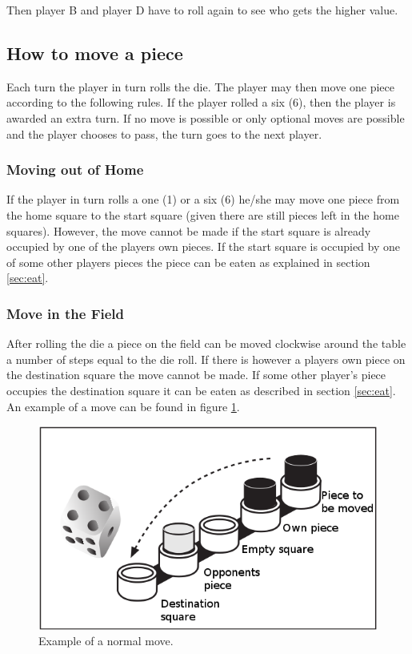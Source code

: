 \documentclass[10pt,a4paper]{article}
\begin{document}
Then player B and player D have to roll again to see who gets the higher value.

\subsection{How to move a piece}

Each turn the player in turn rolls the die. The player may then move one piece according to the following rules. If the player rolled a six (6), then the player is awarded an extra turn. If no move is possible or only optional moves are possible and the player chooses to pass, the turn goes to the next player.

\subsubsection{Moving out of Home}

If the player in turn rolls a one (1) or a six (6) he/she may move one piece from the home square to the start square (given there are still pieces left in the home squares). However, the move cannot be made if the start square is already occupied by one of the players own pieces. If the start square is occupied by one of some other players pieces the piece can be eaten as explained in section \ref{sec:eat}.

\subsubsection{Move in the Field}

After rolling the die a piece on the field can be moved clockwise around the table a number of steps equal to the die roll. If there is however a players own piece on the destination square the move cannot be made. If some other player's piece occupies the destination square it can be eaten as described in section \ref{sec:eat}. An example of a move can be found in figure \ref{fig:move-normal}.

\begin{figure}[H]
\begin{center}
\includegraphics[width=.4\linewidth]{move-1.png}
\end{center}
\caption{Example of a normal move.}
\label{fig:move-normal}
\end{figure}
\end{document}
